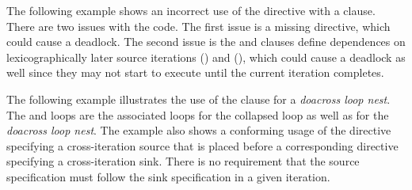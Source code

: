 


The following example shows an incorrect use of the 
directive with a  clause.  There are two issues with the code.  
The first issue is a missing  directive,
which could cause a deadlock.  
The second issue is the  and  
clauses define dependences on lexicographically later 
source iterations () and (), which could cause 
a deadlock as well since they may not start to execute until the current iteration completes.




The following example illustrates the use of the  clause for
a \emph{doacross loop nest}.  The  and  loops are the associated
loops for the collapsed loop as well as for the \emph{doacross loop nest}.
The example also shows a conforming usage of the  directive specifying a cross-iteration source
that is placed before a corresponding  directive specifying a
cross-iteration sink. There is no requirement that the source specification
must follow the sink specification in a given iteration.


